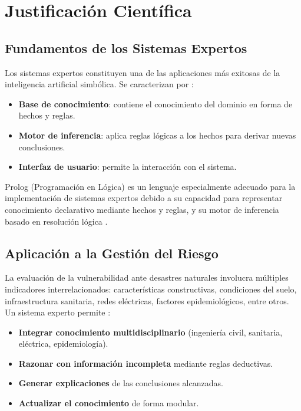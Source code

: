 \documentclass[12pt, letterpaper]{article}
\begin{document}
\section{Justificación Científica}

\subsection{Fundamentos de los Sistemas Expertos}

Los sistemas expertos constituyen una de las aplicaciones más exitosas de la inteligencia artificial simbólica. Se caracterizan por \parencite{gonzalez_2000}:

\begin{itemize}
  \item \textbf{Base de conocimiento}: contiene el conocimiento del dominio en forma de hechos y reglas.
  \item \textbf{Motor de inferencia}: aplica reglas lógicas a los hechos para derivar nuevas conclusiones.
  \item \textbf{Interfaz de usuario}: permite la interacción con el sistema.
\end{itemize}

Prolog (Programación en Lógica) es un lenguaje especialmente adecuado para la implementación de sistemas expertos debido a su capacidad para representar conocimiento declarativo mediante hechos y reglas, y su motor de inferencia basado en resolución lógica \parencite{bratko_2012}.

\subsection{Aplicación a la Gestión del Riesgo}

La evaluación de la vulnerabilidad ante desastres naturales involucra múltiples indicadores interrelacionados: características constructivas, condiciones del suelo, infraestructura sanitaria, redes eléctricas, factores epidemiológicos, entre otros. Un sistema experto permite \parencite{bratko_2012}:

\begin{itemize}
  \item \textbf{Integrar conocimiento multidisciplinario} (ingeniería civil, sanitaria, eléctrica, epidemiología).
  \item \textbf{Razonar con información incompleta} mediante reglas deductivas.
  \item \textbf{Generar explicaciones} de las conclusiones alcanzadas.
  \item \textbf{Actualizar el conocimiento} de forma modular.
\end{itemize}
\end{document}
